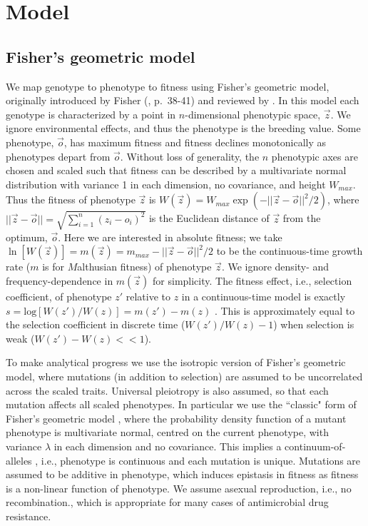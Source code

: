 \documentclass[9pt,twocolumn,twoside,lineno]{gsajnl}
\begin{document}
\section{Model}
\label{sec:model}

\subsection{Fisher's geometric model}
\label{sec:FGM}

We map genotype to phenotype to fitness using Fisher's geometric model, originally introduced by Fisher (\citeyear{Fisher1930}, p.\ 38-41) and reviewed by \cite{Tenaillon2014}.
In this model each genotype is characterized by a point in $n$-dimensional phenotypic space, $\vec{z}$.
We ignore environmental effects, and thus the phenotype is the breeding value.
Some phenotype, $\vec{o}$, has maximum fitness and fitness declines monotonically as phenotypes depart from $\vec{o}$. 
Without loss of generality, the $n$ phenotypic axes are chosen and scaled such that fitness can be described by a multivariate normal distribution with variance 1 in each dimension, no covariance, and height $W_{max}$.
Thus the fitness of phenotype $\vec{z}$ is $W(\vec{z}) = W_{max}\exp(-||\vec{z}-\vec{o}||^2/2)$, where $||\vec{z}-\vec{o}||=\sqrt{\sum_{i=1}^n(z_i-o_i)^2 }$ is the Euclidean distance of $\vec{z}$ from the optimum, $\vec{o}$.
Here we are interested in absolute fitness; we take $\ln[W(\vec{z})]=m(\vec{z})=m_{max}-||\vec{z}-\vec{o}||^2/2$ to be the continuous-time growth rate ($m$ is for $M$althusian fitness) of phenotype $\vec{z}$.
We ignore density- and frequency-dependence in $m(\vec{z})$ for simplicity.
The fitness effect, i.e., selection coefficient, of phenotype $z'$ relative to $z$ in a continuous-time model is exactly $s = \mathrm{log}[W(z')/W(z)] = m(z') - m(z)$ \citep{Martin2015}.
This is approximately equal to the selection coefficient in discrete time ($W(z')/W(z) - 1$) when selection is weak ($W(z')-W(z)<<1$).

To make analytical progress we use the isotropic version of Fisher's geometric model, where mutations (in addition to selection) are assumed to be uncorrelated across the scaled traits.
Universal pleiotropy is also assumed, so that each mutation affects all scaled phenotypes.
In particular we use the ``classic" form of Fisher's geometric model \citep{Harmand2017}, where the probability density function of a mutant phenotype is multivariate normal, centred on the current phenotype, with variance $\lambda$ in each dimension and no covariance.
This implies a continuum-of-alleles \citep{Kimura1965}, i.e., phenotype is continuous and each mutation is unique.
Mutations are assumed to be additive in phenotype, which induces epistasis in fitness as fitness is a non-linear function of phenotype.
We assume asexual reproduction, i.e., no recombination., which is appropriate for many cases of antimicrobial drug resistance.
\end{document}
